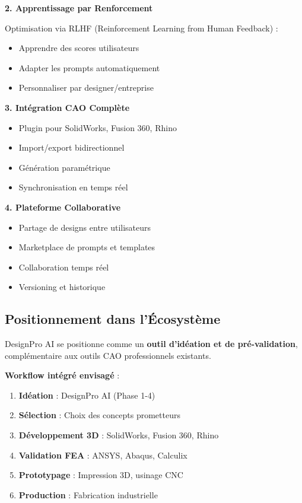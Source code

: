 \textbf{2. Apprentissage par Renforcement}

Optimisation via RLHF (Reinforcement Learning from Human Feedback) :
\begin{itemize}[leftmargin=*]
    \item Apprendre des scores utilisateurs
    \item Adapter les prompts automatiquement
    \item Personnaliser par designer/entreprise
\end{itemize}

\textbf{3. Intégration CAO Complète}

\begin{itemize}[leftmargin=*]
    \item Plugin pour SolidWorks, Fusion 360, Rhino
    \item Import/export bidirectionnel
    \item Génération paramétrique
    \item Synchronisation en temps réel
\end{itemize}

\textbf{4. Plateforme Collaborative}

\begin{itemize}[leftmargin=*]
    \item Partage de designs entre utilisateurs
    \item Marketplace de prompts et templates
    \item Collaboration temps réel
    \item Versioning et historique
\end{itemize}

\subsection{Positionnement dans l'Écosystème}

DesignPro AI se positionne comme un \textbf{outil d'idéation et de pré-validation}, complémentaire aux outils CAO professionnels existants.

\textbf{Workflow intégré envisagé} :
\begin{enumerate}[leftmargin=*]
    \item \textbf{Idéation} : DesignPro AI (Phase 1-4)
    \item \textbf{Sélection} : Choix des concepts prometteurs
    \item \textbf{Développement 3D} : SolidWorks, Fusion 360, Rhino
    \item \textbf{Validation FEA} : ANSYS, Abaqus, Calculix
    \item \textbf{Prototypage} : Impression 3D, usinage CNC
    \item \textbf{Production} : Fabrication industrielle
\end{enumerate}

